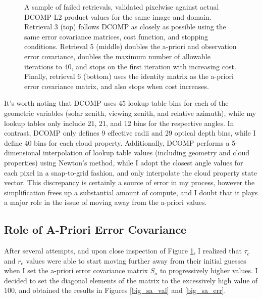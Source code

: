 \documentclass[12pt]{article}
\begin{document}
\begin{figure}[h!]
\begin{center}
{        }
    \end{center}
    \caption{A sample of failed retrievals, validated pixelwise against actual DCOMP L2 product values for the same image and domain. Retrieval 3 (top) follows DCOMP as closely as possible using the same error covariance matrices, cost function, and stopping conditions. Retrieval 5 (middle) doubles the a-priori and observation error covariance, doubles the maximum number of allowable iterations to 40, and stops on the first iteration with increasing cost. Finally, retrieval 6 (bottom) uses the identity matrix as the a-priori error covariance matrix, and also stops when cost increases.}
    \label{bad_retrievals}
\end{figure}

\clearpage

It's worth noting that DCOMP uses 45 lookup table bins for each of the geometric variables (solar zenith, viewing zenith, and relative azimuth),  while my lookup tables only include 21, 21, and 12 bins for the respective angles. In contrast, DCOMP only defines 9 effective radii and 29 optical depth bins, while I define 40 bins for each cloud property. Additionally, DCOMP performs a 5-dimensional interpolation of lookup table values (including geometry and cloud properties) using Newton's method, while I adopt the closest angle values for each pixel in a snap-to-grid fashion, and only interpolate the cloud property state vector. This discrepancy is certainly a source of error in my process, however the simplification frees up a substantial amount of compute, and I doubt that it plays a major role in the issue of moving away from the a-priori values.

\subsection{Role of A-Priori Error Covariance}

After several attempts, and upon close inspection of Figure \ref{bad_retrievals}, I realized that $\tau_c$ and $r_e$ values were able to start moving further away from their initial guesses when I set the a-priori error covariance matrix $S_a$ to progressively higher values. I decided to set the diagonal elements of the matrix to the excessively high value of 100, and obtained the results in Figures \ref{big_sa_val} and \ref{big_sa_err}.
\end{document}
